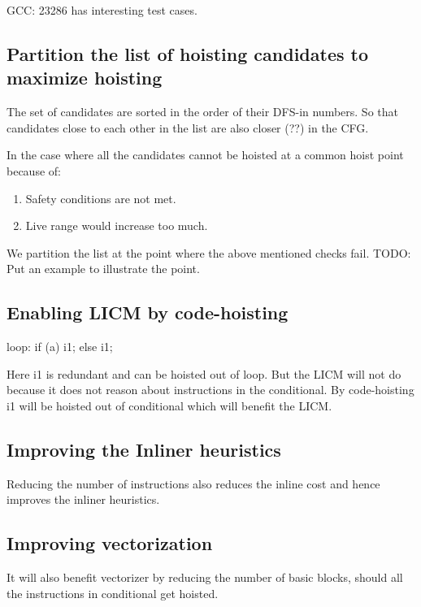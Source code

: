 \begin{section}
GCC: 23286 has interesting test cases.

\section{Partition the list of hoisting candidates to maximize hoisting}
The set of candidates are sorted in the order of their DFS-in numbers. So that candidates close to
each other in the list are also closer (??) in the CFG.

In the case where all the candidates cannot be hoisted at a common hoist point because of:
\begin{enumerate}
\item Safety conditions are not met.
\item Live range would increase too much.
\end{enumerate}

We partition the list at the point where the above mentioned checks fail.
TODO: Put an example to illustrate the point.

\section{Enabling LICM by code-hoisting}
loop:
if (a)
  i1;
else
  i1;

Here i1 is redundant and can be hoisted out of loop. But the LICM will not do because it does not reason about instructions in the conditional.
By code-hoisting i1 will be hoisted out of conditional which will benefit the LICM.

\section{Improving the Inliner heuristics}
Reducing the number of instructions also reduces the inline cost and hence improves the inliner heuristics.

\section{Improving vectorization}
It will also benefit vectorizer by reducing the number
of basic blocks, should all the instructions in conditional get hoisted.

\end{section}


